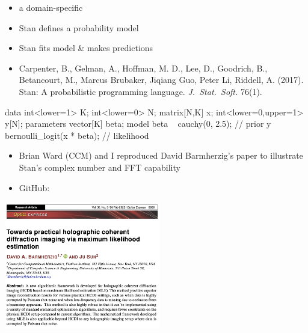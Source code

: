 \documentclass[9pt]{report}
\begin{document}
% 
\begin{itemize}
\item a domain-specific 
\item Stan  defines a  probability model
\item Stan  fits model \& makes predictions
\item \footnotesize Carpenter, B., Gelman, A., Hoffman, M. D., Lee, D., Goodrich, B., Betancourt, M., Marcus Brubaker, Jiqiang Guo, Peter Li, Riddell, A. (2017). Stan: A probabilistic programming language. {\slshape J.\ Stat.\ Soft.} 76(1).
\end{itemize}

% 
\begin{stancode}
  data {
    int<lower=1> K;
    int<lower=0> N;
    matrix[N,K] x;
    int<lower=0,upper=1> y[N];
  }
  parameters {
    vector[K] beta;
  }
  model {
    beta ~ cauchy(0, 2.5);          // prior
    y ~ bernoulli_logit(x * beta);  // likelihood
  }
\end{stancode}

\begin{itemize}
\item \small Brian Ward (CCM) and I reproduced David Barmherzig's
  paper to illustrate Stan's complex number and FFT capability
\item \footnotesize GitHub: 
\end{itemize}
\begin{center}
  \includegraphics[width=0.51\textwidth]{img/barmherzig-cite.png}
\end{center}
\end{document}
